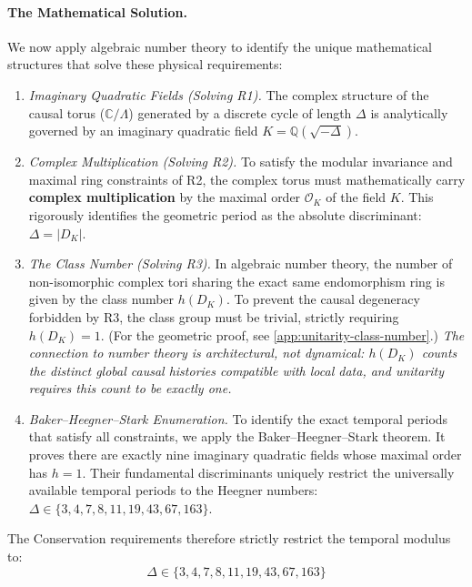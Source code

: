 \paragraph{The Mathematical Solution.} We now apply algebraic number theory to identify the unique mathematical structures that solve these physical requirements:
\begin{enumerate}
    \item[\textbf{(M1)}] \emph{Imaginary Quadratic Fields (Solving R1).} The complex structure of the causal torus ($\mathbb{C}/\Lambda$) generated by a discrete cycle of length $\Delta$ is analytically governed by an imaginary quadratic field $K = \mathbb{Q}(\sqrt{-\Delta})$.

    \item[\textbf{(M2)}] \emph{Complex Multiplication (Solving R2).} To satisfy the modular invariance and maximal ring constraints of R2, the complex torus must mathematically carry \textbf{complex multiplication} by the maximal order $\mathcal{O}_K$ of the field $K$. This rigorously identifies the geometric period as the absolute discriminant: $\Delta = |D_K|$.

    \item[\textbf{(M3)}] \emph{The Class Number (Solving R3).} In algebraic number theory, the number of non-isomorphic complex tori sharing the exact same endomorphism ring is given by the class number $h(D_K)$. To prevent the causal degeneracy forbidden by R3, the class group must be trivial, strictly requiring $h(D_K) = 1$. (For the geometric proof, see \cref{app:unitarity-class-number}.) \textit{The connection to number theory is architectural, not dynamical: $h(D_K)$ counts the distinct global causal histories compatible with local data, and unitarity requires this count to be exactly one.}

    \item[\textbf{(M4)}] \emph{Baker--Heegner--Stark Enumeration.} To identify the exact temporal periods that satisfy all constraints, we apply the Baker--Heegner--Stark theorem. It proves there are exactly nine imaginary quadratic fields whose maximal order has $h=1$. Their fundamental discriminants uniquely restrict the universally available temporal periods to the Heegner numbers: $\Delta \in \{3, 4, 7, 8, 11, 19, 43, 67, 163\}$.
\end{enumerate}

The Conservation requirements therefore strictly restrict the temporal modulus to:
\begin{equation}
    \label{eq:heegner_modulus_set}
    \Delta \in \{3, 4, 7, 8, 11, 19, 43, 67, 163\}
\end{equation}


